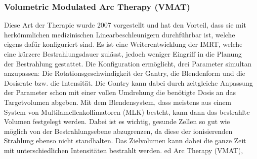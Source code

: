 \subsubsection{Volumetric Modulated Arc Therapy (VMAT)}
Diese Art der Therapie wurde 2007 vorgestellt und hat den Vorteil, dass sie mit herkömmlichen medizinischen Linearbeschleunigern durchführbar ist, welche eigens dafür konfiguriert sind.\cite{nicht_so_shady_author}
Es ist eine Weiterentwicklung der IMRT, welche eine kürzere Bestrahlungsdauer zulässt, jedoch weniger Eingriff in die Planung der Bestrahlung gestattet.
Die Konfiguration ermöglicht, drei Parameter simultan anzupassen: Die Rotationsgeschwindigkeit der Gantry, die Blendenform und die Dosisrate bzw. die Intensität. 
Die Gantry kann dabei durch zeitgleiche Anpassung der Parameter schon mit einer vollen Umdrehung die benötigte Dosis an das Targetvolumen abgeben.
Mit dem Blendensystem, dass meistens aus einem System von Multilamellenkollimatoren (MLK) besteht, kann dann das bestrahlte Volumen festgelegt werden.
Dabei ist es wichtig, gesunde Zellen so gut wie möglich von der Bestrahlungsebene abzugrenzen, da diese der ionisierenden Strahlung ebenso nicht standhalten.
Das Zielvolumen kann dabei die ganze Zeit mit unterschiedlichen Intensitäten bestrahlt werden.\cite{haha_ka}
ed Arc Therapy (VMAT), 



